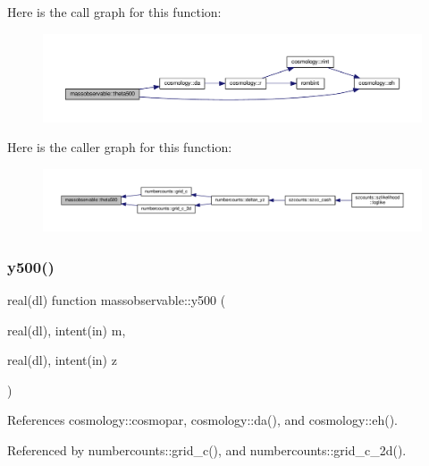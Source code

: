 Here is the call graph for this function\+:
\nopagebreak
\begin{figure}[H]
\begin{center}
\leavevmode
\includegraphics[width=350pt]{namespacemassobservable_a4be614d859b3c2e06a7674a7af153ff5_cgraph}
\end{center}
\end{figure}
Here is the caller graph for this function\+:
\nopagebreak
\begin{figure}[H]
\begin{center}
\leavevmode
\includegraphics[width=350pt]{namespacemassobservable_a4be614d859b3c2e06a7674a7af153ff5_icgraph}
\end{center}
\end{figure}
\mbox{\label{namespacemassobservable_a4eca145d43dd43892e21b73f42ace63e}} 
\subsubsection{\texorpdfstring{y500()}{y500()}}
{\footnotesize\ttfamily real(dl) function massobservable\+::y500 (\begin{DoxyParamCaption}\item[{real(dl), intent(in)}]{m,  }\item[{real(dl), intent(in)}]{z }\end{DoxyParamCaption})}



References cosmology\+::cosmopar, cosmology\+::da(), and cosmology\+::eh().



Referenced by numbercounts\+::grid\+\_\+c(), and numbercounts\+::grid\+\_\+c\+\_\+2d().

